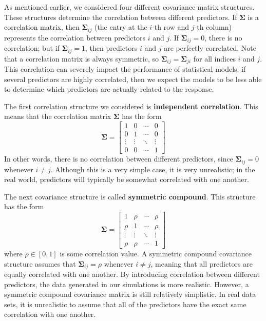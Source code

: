 \documentclass{article}
\begin{document}
	As mentioned earlier, we considered four different covariance matrix structures. These structures determine the correlation between different predictors. If $\mathbf{\Sigma}$ is a correlation matrix, then $\mathbf{\Sigma}_{ij}$ (the entry at the $i$-th row and $j$-th column) represents the correlation between predictors $i$ and $j$. If $\mathbf{\Sigma}_{ij}=0$, there is no correlation; but if $\mathbf{\Sigma}_{ij}=1$, then predictors $i$ and $j$ are perfectly correlated. Note that a correlation matrix is always symmetric, so $\mathbf{\Sigma}_{ij} = \mathbf{\Sigma}_{ji}$ for all indices $i$ and $j$. This correlation can severely impact the performance of statistical models; if several predictors are highly correlated, then we expect the models to be less able to determine which predictors are actually related to the response.
	
	The first correlation structure we considered is \textbf{independent correlation}. This means that the correlation matrix $\mathbf{\Sigma}$ has the form
	\begin{equation}
		\mathbf{\Sigma} = \begin{bmatrix}
			1 & 0 & \cdots & 0 \\
			0 & 1 & \cdots & 0 \\
			\vdots & \vdots & \ddots & \vdots \\
			0 & 0 & \cdots & 1
		\end{bmatrix}
	\end{equation}
	In other words, there is no correlation between different predictors, since $\mathbf{\Sigma}_{ij} = 0$ whenever $i\neq j$. Although this is a very simple case, it is very unrealistic; in the real world, predictors will typically be somewhat correlated with one another.
	
	The next covariance structure is called \textbf{symmetric compound}. This structure has the form
	\begin{equation}\label{eqn:symmetric-compound-matrix}
		\mathbf{\Sigma} = \begin{bmatrix}
			1 & \rho & \cdots & \rho \\
			\rho & 1 & \cdots & \rho \\
			\vdots & \vdots & \ddots & \vdots \\
			\rho & \rho & \cdots & 1
		\end{bmatrix}
	\end{equation}
	where $\rho \in [0, 1]$ is some correlation value. A symmetric compound covariance structure assumes that $\mathbf{\Sigma}_{ij} = \rho$ whenever $i \neq j$, meaning that all predictors are equally correlated with one another. By introducing correlation between different predictors, the data generated in our simulations is more realistic. However, a symmetric compound covariance matrix is still relatively simplistic. In real data sets, it is unrealistic to assume that all of the predictors have the exact same correlation with one another.
	
\end{document}
